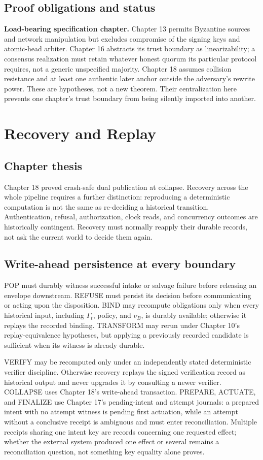 \documentclass[11pt,openany]{book}
\begin{document}
\section{Proof obligations and status}
\textbf{Load-bearing specification chapter.} Chapter 13 permits Byzantine
sources and network manipulation but excludes compromise of the signing keys
and atomic-head arbiter. Chapter 16 abstracts its trust boundary as
linearizability; a consensus realization must retain whatever honest quorum
its particular protocol requires, not a generic unspecified majority.
Chapter 18 assumes collision resistance and at least one authentic later
anchor outside the adversary's rewrite power. These are hypotheses, not a new
theorem. Their centralization here prevents one chapter's trust boundary from
being silently imported into another.

\chapter{Recovery and Replay}
\section{Chapter thesis}
Chapter 18 proved crash-safe dual publication at collapse. Recovery across the
whole pipeline requires a further distinction: reproducing a deterministic
computation is not the same as re-deciding a historical transition.
Authentication, refusal, authorization, clock reads, and concurrency outcomes
are historically contingent. Recovery must normally reapply their durable
records, not ask the current world to decide them again.

\section{Write-ahead persistence at every boundary}
POP must durably witness successful intake or salvage failure before releasing
an envelope downstream. REFUSE must persist its decision before communicating
or acting upon the disposition. BIND may recompute obligations only when every
historical input, including \(\Gamma_t\), policy, and \(\nu_B\), is durably
available; otherwise it replays the recorded binding. TRANSFORM may rerun under
Chapter 10's replay-equivalence hypotheses, but applying a previously recorded
candidate is sufficient when its witness is already durable.

VERIFY may be recomputed only under an independently stated deterministic
verifier discipline. Otherwise recovery replays the signed verification record
as historical output and never upgrades it by consulting a newer verifier.
COLLAPSE uses Chapter 18's write-ahead transaction. PREPARE, ACTUATE, and
FINALIZE use Chapter 17's pending-intent and attempt journals: a prepared intent
with no attempt witness is pending first actuation, while an attempt without a
conclusive receipt is ambiguous and must enter reconciliation. Multiple
receipts sharing one intent key are records concerning one requested effect;
whether the external system produced one effect or several remains a
reconciliation question, not something key equality alone proves.
\end{document}
